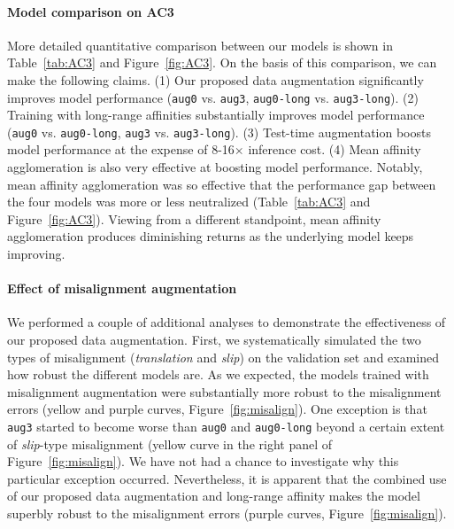\documentclass{article}
\begin{document}
\paragraph{Model comparison on AC3} More detailed quantitative comparison
between our models is shown in Table~\ref{tab:AC3} and Figure~\ref{fig:AC3}. On
the basis of this comparison, we can make the following claims. (1) Our proposed
data augmentation significantly improves model performance (\texttt{aug0} vs.
\texttt{aug3}, \texttt{aug0-long} vs. \texttt{aug3-long}). (2) Training with
long-range affinities substantially improves model performance (\texttt{aug0}
vs. \texttt{aug0-long}, \texttt{aug3} vs. \texttt{aug3-long}). (3) Test-time
augmentation boosts model performance at the expense of 8-16$\times$ inference
cost. (4) Mean affinity agglomeration is also very effective at boosting model
performance. Notably, mean affinity agglomeration was so effective that the
performance gap between the four models was more or less neutralized
(Table~\ref{tab:AC3} and Figure~\ref{fig:AC3}). Viewing from a different
standpoint, mean affinity agglomeration produces diminishing returns as the
underlying model keeps improving.

\paragraph{Effect of misalignment augmentation} We performed a couple of
additional analyses to demonstrate the effectiveness of our proposed data
augmentation. First, we systematically simulated the two types of misalignment
(\textit{translation} and \textit{slip}) on the validation set and examined how
robust the different models are. As we expected, the models trained with
misalignment augmentation were substantially more robust to the misalignment
errors (yellow and purple curves, Figure~\ref{fig:misalign}). One exception is
that \texttt{aug3} started to become worse than \texttt{aug0} and
\texttt{aug0-long} beyond a certain extent of \textit{slip}-type misalignment
(yellow curve in the right panel of Figure~\ref{fig:misalign}). We have not had
a chance to investigate why this particular exception occurred. Nevertheless, it
is apparent that the combined use of our proposed data augmentation and
long-range affinity makes the model superbly robust to the misalignment errors
(purple curves, Figure~\ref{fig:misalign}).
\end{document}
